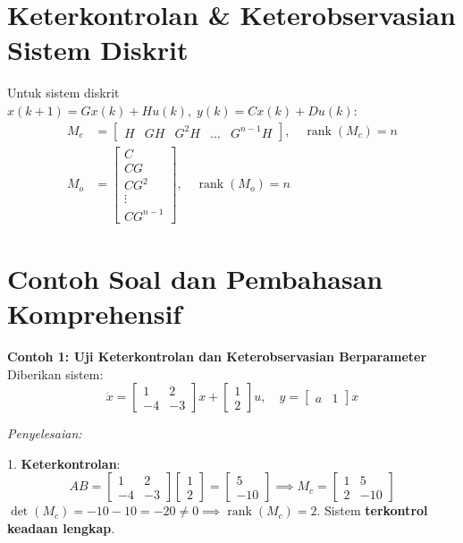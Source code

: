 \documentclass[11pt,a4paper]{article}
\begin{document}
\vspace{6pt}

\section{Keterkontrolan \& Keterobservasian Sistem Diskrit}

Untuk sistem diskrit $x(k+1) = G x(k) + H u(k), \; y(k) = C x(k) + D u(k)$:
\begin{align*}
    M_c &= \begin{bmatrix} H & GH & G^2 H & \dots & G^{n-1} H \end{bmatrix}, \quad \operatorname{rank}(M_c) = n \\
    M_o &= \begin{bmatrix} C \\ CG \\ CG^2 \\ \vdots \\ CG^{n-1} \end{bmatrix}, \quad \operatorname{rank}(M_o) = n
\end{align*}

\vspace{6pt}

\section{Contoh Soal dan Pembahasan Komprehensif}

\noindent\textbf{Contoh 1: Uji Keterkontrolan dan Keterobservasian Berparameter}\\
Diberikan sistem:
\begin{equation*}
    \dot{x} = \begin{bmatrix} 1 & 2 \\ -4 & -3 \end{bmatrix} x + \begin{bmatrix} 1 \\ 2 \end{bmatrix} u, \quad y = \begin{bmatrix} a & 1 \end{bmatrix} x
\end{equation*}

\textit{Penyelesaian:}

1. \textbf{Keterkontrolan}:
\begin{equation*}
    AB = \begin{bmatrix} 1 & 2 \\ -4 & -3 \end{bmatrix} \begin{bmatrix} 1 \\ 2 \end{bmatrix} = \begin{bmatrix} 5 \\ -10 \end{bmatrix} \implies M_c = \begin{bmatrix} 1 & 5 \\ 2 & -10 \end{bmatrix}
\end{equation*}
$\det(M_c) = -10 - 10 = -20 \ne 0 \implies \operatorname{rank}(M_c) = 2$. Sistem \textbf{terkontrol keadaan lengkap}.
\end{document}
